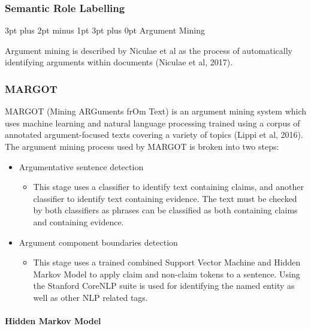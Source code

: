 \documentclass[12pt,a4paper]{article}
\makeatletter
\renewcommand\subsection{\@startsection {subsection}{1}{2mm} %
                               {3pt plus 2pt minus 1pt} %
                               {3pt plus 0pt} %
                               {\normalfont\bfseries}}
\makeatother
\begin{document}
\subsubsection{Semantic Role Labelling}



\subsection{Argument Mining}

Argument mining is described by Niculae et al as the process of automatically identifying arguments within documents (Niculae et al, 2017). 

\subsubsection{MARGOT}

MARGOT (Mining ARGuments frOm Text) is an argument mining system which uses machine learning and natural language processing trained using a corpus of annotated argument-focused texts covering a variety of topics (Lippi et al, 2016). The argument mining process used by MARGOT is broken into two steps:

\begin{itemize}
    \item Argumentative sentence detection
    \begin{itemize}
        \item This stage uses a classifier to identify text containing claims, and another classifier to identify text containing evidence. The text must be checked by both classifiers as phrases can be classified as both containing claims and containing evidence.
    \end{itemize}
    \item Argument component boundaries detection
    \begin{itemize}
        \item This stage uses a trained combined Support Vector Machine and Hidden Markov Model to apply claim and non-claim tokens to a sentence. Using the Stanford CoreNLP suite is used for identifying the named entity as well as other NLP related tags. 
    \end{itemize}
\end{itemize}

\paragraph{Hidden Markov Model}\mbox{}\\
\end{document}
